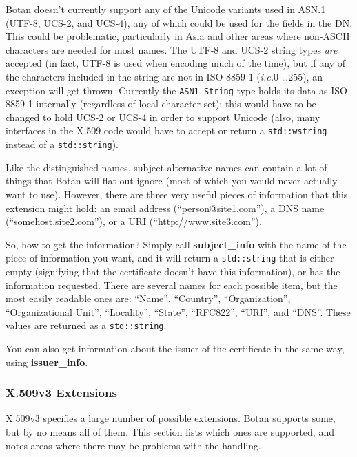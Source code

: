 \documentclass{article}
\newcommand{\function}[1]{\textbf{#1}}
\newcommand{\type}[1]{\texttt{#1}}
\newcommand{\ie}[0]{\emph{i.e.}}
\begin{document}
Botan doesn't currently support any of the Unicode variants used in ASN.1
(UTF-8, UCS-2, and UCS-4), any of which could be used for the fields in the
DN. This could be problematic, particularly in Asia and other areas where
non-ASCII characters are needed for most names. The UTF-8 and UCS-2 string
types \emph{are} accepted (in fact, UTF-8 is used when encoding much of the
time), but if any of the characters included in the string are not in ISO
8859-1 (\ie 0 \ldots 255), an exception will get thrown. Currently the
\type{ASN1\_String} type holds its data as ISO 8859-1 internally (regardless
of local character set); this would have to be changed to hold UCS-2 or UCS-4
in order to support Unicode (also, many interfaces in the X.509 code would have
to accept or return a \type{std::wstring} instead of a \type{std::string}).

Like the distinguished names, subject alternative names can contain a lot of
things that Botan will flat out ignore (most of which you would never actually
want to use). However, there are three very useful pieces of information that
this extension might hold: an email address (``person@site1.com''), a DNS name
(``somehost.site2.com''), or a URI (``http://www.site3.com'').

So, how to get the information? Simply call \function{subject\_info} with the
name of the piece of information you want, and it will return a
\type{std::string} that is either empty (signifying that the certificate
doesn't have this information), or has the information requested. There are
several names for each possible item, but the most easily readable ones are:
``Name'', ``Country'', ``Organization'', ``Organizational Unit'', ``Locality'',
``State'', ``RFC822'', ``URI'', and ``DNS''. These values are returned as a
\type{std::string}.

You can also get information about the issuer of the certificate in the same
way, using \function{issuer\_info}.

\subsubsection{X.509v3 Extensions}

X.509v3 specifies a large number of possible extensions. Botan
supports some, but by no means all of them. This section lists which
ones are supported, and notes areas where there may be problems with
the handling.
\end{document}
